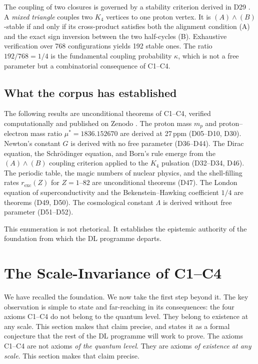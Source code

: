 \documentclass[12pt,a4paper]{article}
\theoremstyle{plain}
\theoremstyle{definition}
\theoremstyle{remark}
\newcommand{\Kfour}{K_4}
\begin{document}
The coupling of two closures is governed by a stability criterion derived in D29
\cite{D29}. A \emph{mixed triangle} couples two $\Kfour$ vertices to one proton
vertex. It is $(A)\wedge(B)$-stable if and only if its cross-product satisfies both
the alignment condition (A) and the exact sign inversion between the two half-cycles
(B). Exhaustive verification over 768 configurations yields 192 stable ones. The
ratio $192/768 = 1/4$ is the fundamental coupling probability $\kappa$, which is not
a free parameter but a combinatorial consequence of C1--C4.

\subsection{What the corpus has established}

The following results are unconditional theorems of C1--C4, verified computationally
and published on Zenodo \cite{DM_v18}. The proton mass $m_p$ and proton--electron
mass ratio $\mu^* = 1836.152670$ are derived at 27\,ppm (D05--D10, D30). Newton's
constant $G$ is derived with no free parameter (D36--D44). The Dirac equation, the
Schrödinger equation, and Born's rule emerge from the $(A)\wedge(B)$ coupling
criterion applied to the $\Kfour$ pulsation (D32--D34, D46). The periodic table, the
magic numbers of nuclear physics, and the shell-filling rates $r_{\mathrm{exc}}(Z)$
for $Z = 1$--$82$ are unconditional theorems (D47). The London equation of
superconductivity and the Bekenstein--Hawking coefficient $1/4$ are theorems (D49,
D50). The cosmological constant $\Lambda$ is derived without free parameter
(D51--D52).

This enumeration is not rhetorical. It establishes the epistemic authority of the
foundation from which the DL programme departs.

\section{The Scale-Invariance of C1--C4}
\label{sec:scaleinvariance}

We have recalled the foundation. We now take the first step beyond it. The key
observation is simple to state and far-reaching in its consequences: the four axioms
C1--C4 do not belong to the quantum level. They belong to existence at any scale.
This section makes that claim precise, and states it as a formal conjecture that the
rest of the DL programme will work to prove. The axioms C1--C4
are not axioms \emph{of the quantum level}. They are axioms \emph{of existence at
any scale}. This section makes that claim precise.
\end{document}
